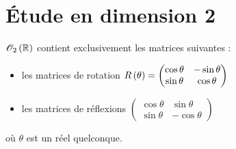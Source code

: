 \section{Étude en dimension 2}

\begin{prop}
\(\Orth{2}[\R]\) contient exclusivement les matrices suivantes :

\begin{itemize}
    \item les matrices de rotation \(R\left(\theta\right)=\begin{pmatrix}
        \cos\theta & -\sin\theta \\
        \sin\theta & \cos\theta
    \end{pmatrix}\) \\
    \item les matrices de réflexions \(\begin{pmatrix}
        \cos\theta & \sin\theta \\
        \sin\theta & -\cos\theta
    \end{pmatrix}\)
\end{itemize}

où \(\theta\) est un réel quelconque.
\end{prop}

